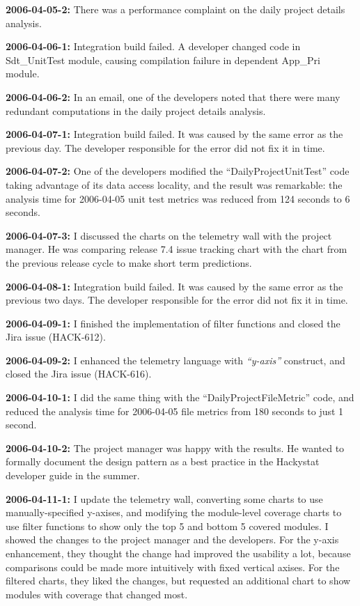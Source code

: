 \textbf{2006-04-05-2:}
There was a performance complaint on the daily project details analysis.

\textbf{2006-04-06-1:}
Integration build failed. A developer changed code in Sdt\_UnitTest module, causing compilation failure in dependent App\_Pri module. 

\textbf{2006-04-06-2:}
In an email, one of the developers noted that there were many redundant computations in the daily project details analysis.

\textbf{2006-04-07-1:}
Integration build failed. It was caused by the same error as the previous day. The developer responsible for the error did not fix it in time.

\textbf{2006-04-07-2:}
One of the developers modified the ``DailyProjectUnitTest'' code taking advantage of its data access locality, and the result was remarkable: the analysis time for 2006-04-05 unit test metrics was reduced from 124 seconds to 6 seconds.

\textbf{2006-04-07-3:}
I discussed the charts on the telemetry wall with the project manager. He was comparing release 7.4 issue tracking chart with the chart from the previous release cycle to make short term predictions.

\textbf{2006-04-08-1:}
Integration build failed. It was caused by the same error as the previous two days. The developer responsible for the error did not fix it in time.

\textbf{2006-04-09-1:}
I finished the implementation of filter functions and closed the Jira issue (HACK-612).

\textbf{2006-04-09-2:}
I enhanced the telemetry language with \textit{``y-axis''} construct, and closed the Jira issue (HACK-616). 

\textbf{2006-04-10-1:}
I did the same thing with the ``DailyProjectFileMetric'' code, and reduced the analysis time for 2006-04-05 file metrics from 180 seconds to just 1 second.

\textbf{2006-04-10-2:}
The project manager was happy with the results. He wanted to formally document the design pattern as a best practice in the Hackystat developer guide in the summer.

\textbf{2006-04-11-1:}
I update the telemetry wall, converting some charts to use manually-specified y-axises, and modifying the module-level coverage charts to use filter functions to show only the top 5 and bottom 5 covered modules. I showed the changes to the project manager and the developers. For the y-axis enhancement, they thought the change had improved the usability a lot, because comparisons could be made more intuitively with fixed vertical axises. For the filtered charts, they liked the changes, but requested an additional chart to show modules with coverage that changed most.

